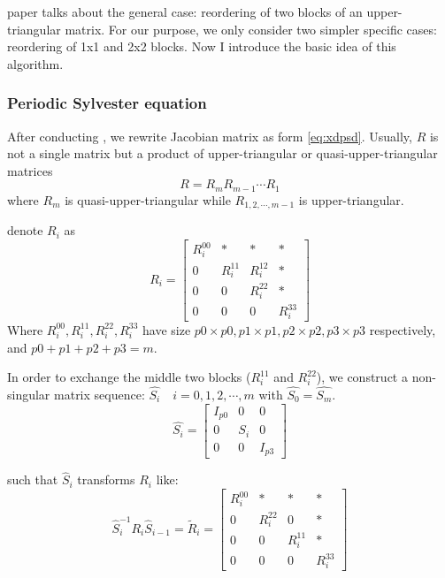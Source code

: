paper  talks about the general case: reordering of two
blocks of an upper-triangular matrix. For our purpose, we only
consider two simpler specific cases: reordering of 1x1 and 2x2
blocks. Now I introduce the basic idea of this algorithm.

\subsubsection{Periodic Sylvester equation}
After conducting \psd , we rewrite Jacobian matrix as form
 \eqref{eq:xdpsd}. Usually, $R$ is not a single matrix but
a product of upper-triangular or quasi-upper-triangular
matrices
\begin{equation}
R=R_{m}R_{m-1}\cdots R_{1}
\label{eq:xduppertriangular}
\end{equation}
where $R_{m}$ is quasi-upper-triangular while $R_{1,2,\cdots,m-1}$ is
upper-triangular.

denote $R_{i}$ as
\[
R_{i}=
\left[
\begin{array}{c|cc|c}
  R^{00}_{i} & * & *& * \\ \hline
  0 & R^{11}_{i} & R^{12}_{i} & * \\
  0 & 0 & R^{22}_{i} & * \\ \hline
  0 & 0 & 0 & R^{33}_{i}
\end{array}
\right]
\]
Where $R^{00}_{i}, R^{11}_{i},R^{22}_{i},R^{33}_{i}$ have size
$p0\times p0,p1\times p1,p2\times p2,p3\times p3$ respectively,
 and $p0+p1+p2+p3=m$.

In order to exchange the middle two blocks ($R^{11}_{i}$
and $R^{22}_{i}$), we construct a non-singular matrix sequence:
$\hat{S_{i}}\quad i=0,1,2,\cdots,m$ with $\hat{S_{0}}=\hat{S_{m}}$.
\[
\hat{S_{i}}=
\left[
\begin{array}{c|c|c}
  I_{p0} & 0 & 0  \\ \hline
  0 & S_{i} & 0 \\ \hline
  0 & 0 & I_{p3}
\end{array}
\right]
\]

such that $\hat{S}_{i}$ transforms $R_{i}$ like:
\begin{equation}
\label{eq:xdtransform}
\hat{S}_{i}^{-1}R_{i}\hat{S}_{i-1}=\tilde{R}_{i}=
\left[
\begin{array}{c|cc|c}
  R^{00}_{i} & * & *& * \\ \hline
  0 & R^{22}_{i} & 0 & * \\
  0 & 0 & R^{11}_{i} & * \\ \hline
  0 & 0 & 0 & R^{33}_{i}
\end{array}
\right]
\end{equation}

